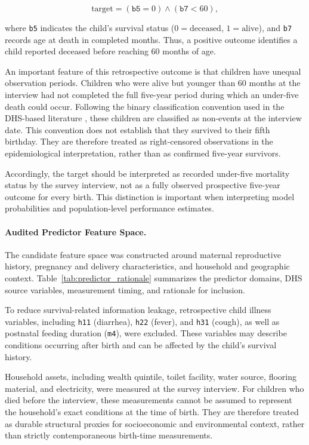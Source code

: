 \documentclass[a4paper,fleqn]{cas-sc}
\begin{document}
\begin{equation}
  \text{target} =
  (\texttt{b5}=0) \land (\texttt{b7}<60),
  \label{eq:target_def}
\end{equation}

where \texttt{b5} indicates the child's survival status ($0=\text{deceased}$, $1=\text{alive}$), and \texttt{b7} records age at death in completed months. Thus, a positive outcome identifies a child reported deceased before reaching 60 months of age.

An important feature of this retrospective outcome is that children have unequal observation periods. Children who were alive but younger than 60 months at the interview had not completed the full five-year period during which an under-five death could occur. Following the binary classification convention used in the DHS-based literature \cite{oduse2024,naznin2025,bitew2020}, these children are classified as non-events at the interview date. This convention does not establish that they survived to their fifth birthday. They are therefore treated as right-censored observations in the epidemiological interpretation, rather than as confirmed five-year survivors.

Accordingly, the target should be interpreted as recorded under-five mortality status by the survey interview, not as a fully observed prospective five-year outcome for every birth. This distinction is important when interpreting model probabilities and population-level performance estimates.

\paragraph{Audited Predictor Feature Space.}
The candidate feature space was constructed around maternal reproductive history, pregnancy and delivery characteristics, and household and geographic context. Table~\ref{tab:predictor_rationale} summarizes the predictor domains, DHS source variables, measurement timing, and rationale for inclusion.

To reduce survival-related information leakage, retrospective child illness variables, including \texttt{h11} (diarrhea), \texttt{h22} (fever), and \texttt{h31} (cough), as well as postnatal feeding duration (\texttt{m4}), were excluded. These variables may describe conditions occurring after birth and can be affected by the child's survival history.

Household assets, including wealth quintile, toilet facility, water source, flooring material, and electricity, were measured at the survey interview. For children who died before the interview, these measurements cannot be assumed to represent the household's exact conditions at the time of birth. They are therefore treated as durable structural proxies for socioeconomic and environmental context, rather than strictly contemporaneous birth-time measurements.
\end{document}
